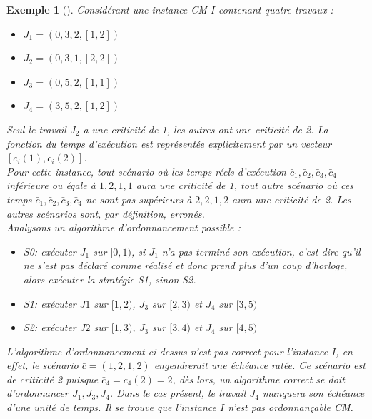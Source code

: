 \documentclass[11pt,a4paper,oneside]{book}
\theoremstyle{break}
\newtheorem{exem}{Exemple}
\theoremstyle{breakplain}
\begin{document}
\begin{exem}[\cite{baruah2010towards}]
Considérant une instance CM $I$ contenant quatre travaux :
\begin{itemize}
\item $J_1 = (0,3,2,[1,2])$
\item $J_2 = (0,3,1,[2,2])$
\item $J_3 = (0,5,2,[1,1])$
\item $J_4 = (3,5,2,[1,2])$\\
\end{itemize}

Seul le travail $J_2$ a une criticité de 1, les autres ont une criticité de 2. La fonction du temps d'exécution est représentée explicitement par un vecteur $[c_i(1), c_i(2)]$.\\
Pour cette instance, tout scénario où les temps réels d'exécution $\bar{c}_1,\bar{c}_2,\bar{c}_3,\bar{c}_4$ inférieure ou égale à $1,2,1,1$ aura une criticité de 1, tout autre scénario où ces temps $\bar{c}_1,\bar{c}_2,\bar{c}_3,\bar{c}_4$ ne sont pas supérieurs à $ 2,2,1,2$ aura une criticité de 2. Les autres scénarios sont, par définition, erronés.\\

Analysons un algorithme d'ordonnancement possible :
\begin{itemize}
\item S0: exécuter $J_1$ sur $[0,1)$, si $J_1$ n'a pas terminé son exécution, c'est dire qu'il ne s'est pas déclaré comme réalisé et donc prend plus d’un coup d'horloge, alors exécuter la stratégie S1, sinon S2.
\item S1: exécuter $J1$ sur $[1,2)$, $J_3$ sur $[2,3)$ et $J_4$ sur $[3,5)$
\item S2: exécuter $J2$ sur $[1,3)$, $J_3$ sur $[3,4)$ et $J_4$ sur $[4,5)$\\
\end{itemize}

L'algorithme d'ordonnancement ci-dessus n'est pas correct pour l'instance $I$, en effet, le scénario $\bar{c} = (1,2,1,2)$ engendrerait une échéance ratée. Ce scénario est de criticité 2 puisque $\bar{c}_4 = c_4(2) = 2$, dès lors, un algorithme correct se doit d'ordonnancer $J_1, J_3, J_4$. Dans le cas présent, le travail $J_4$ manquera son échéance d'une unité de temps. Il se trouve que l'instance $I$ n'est pas ordonnançable CM.
\end{exem}
\end{document}
